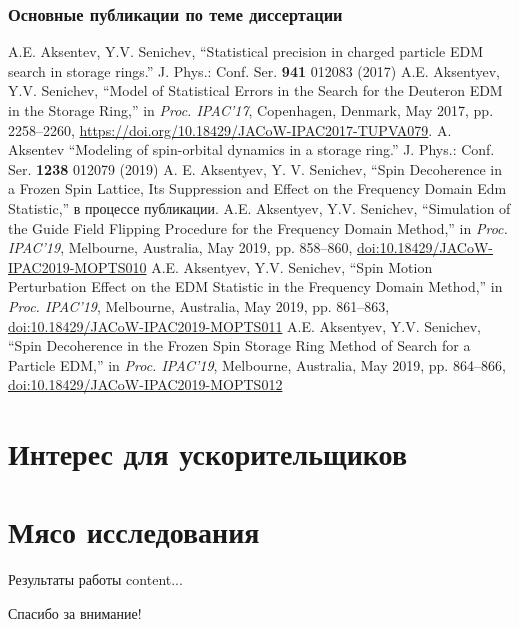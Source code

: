\documentclass[14pt]{beamer}
\begin{document}
\begin{frame}[allowframebreaks]
	\frametitle{Основные публикации по теме диссертации}
	\begin{thebibliography}{9}
		A.E. Aksentev, Y.V. Senichev, ``Statistical precision in charged particle {EDM} search in storage rings.'' J. Phys.: Conf. Ser. \textbf{941} 012083 (2017)
		A.E. Aksentyev, Y.V. Senichev,
		``Model of Statistical Errors in the Search for the Deuteron EDM in the Storage Ring,''
		in \emph{Proc. IPAC'17}, Copenhagen, Denmark, May 2017, pp. 2258--2260,
		\url{https://doi.org/10.18429/JACoW-IPAC2017-TUPVA079}.
		A. Aksentev ``Modeling of spin-orbital dynamics in a storage ring.'' J. Phys.: Conf. Ser. \textbf{1238} 012079 (2019)		
		A. E. Aksentyev, Y. V. Senichev, ``Spin Decoherence in a Frozen Spin Lattice, Its Suppression and Effect on the Frequency Domain Edm Statistic,''  в процессе публикации.
		A.E. Aksentyev, Y.V. Senichev, ``Simulation of the Guide Field Flipping Procedure for the Frequency Domain Method,'' in \emph{Proc. IPAC'19}, Melbourne, Australia, May 2019, pp. 858--860, \url{doi:10.18429/JACoW-IPAC2019-MOPTS010}
		A.E. Aksentyev, Y.V. Senichev, ``Spin Motion Perturbation Effect on the EDM Statistic in the Frequency Domain Method,'' in \emph{Proc. IPAC'19}, Melbourne, Australia, May 2019, pp. 861--863,
		\url{doi:10.18429/JACoW-IPAC2019-MOPTS011}
		A.E. Aksentyev, Y.V. Senichev, ``Spin Decoherence in the Frozen Spin Storage Ring Method of Search for a Particle EDM,'' in \emph{Proc. IPAC'19}, Melbourne, Australia, May 2019, pp. 864--866,
		\url{doi:10.18429/JACoW-IPAC2019-MOPTS012}
	\end{thebibliography}
\end{frame}

\section{Интерес для ускорительщиков}

\section{Мясо исследования}

\begin{frame}{Результаты работы}
	content...
\end{frame}

\begin{frame}
\begin{center}
Спасибо за внимание!
\end{center}
\end{frame}
\end{document}
